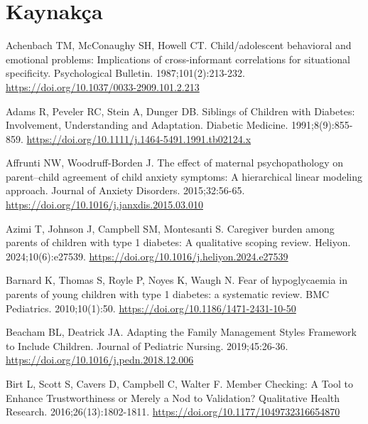\documentclass[
  turkish,
  a4paper,
  DIV=11,
  numbers=noendperiod]{scrreprt}
\newlength{\cslhangindent}
\newenvironment{CSLReferences}[2] %
 {\begin{list}{}{%
  \setlength{\itemindent}{0pt}
  \setlength{\leftmargin}{0pt}
  \setlength{\parsep}{0pt}
  \ifodd #1
   \setlength{\leftmargin}{\cslhangindent}
   \setlength{\itemindent}{-1\cslhangindent}
  \fi
  \setlength{\itemsep}{#2\baselineskip}}}
 {\end{list}}
\begin{document}
\chapter*{Kaynakça}\label{kaynakuxe7a}

\protect{}\label{refs}
\begin{CSLReferences}{1}{0}
Achenbach TM, McConaughy SH, Howell CT. Child/adolescent behavioral and
emotional problems: Implications of cross-informant correlations for
situational specificity. Psychological Bulletin. 1987;101(2):213-232.
\url{https://doi.org/10.1037/0033-2909.101.2.213}

Adams R, Peveler RC, Stein A, Dunger DB. Siblings of Children with
Diabetes: Involvement, Understanding and Adaptation. Diabetic Medicine.
1991;8(9):855-859.
\url{https://doi.org/10.1111/j.1464-5491.1991.tb02124.x}

Affrunti NW, Woodruff-Borden J. The effect of maternal psychopathology
on parent--child agreement of child anxiety symptoms: A hierarchical
linear modeling approach. Journal of Anxiety Disorders. 2015;32:56-65.
\url{https://doi.org/10.1016/j.janxdis.2015.03.010}

Azimi T, Johnson J, Campbell SM, Montesanti S. Caregiver burden among
parents of children with type 1 diabetes: A qualitative scoping review.
Heliyon. 2024;10(6):e27539.
\url{https://doi.org/10.1016/j.heliyon.2024.e27539}

Barnard K, Thomas S, Royle P, Noyes K, Waugh N. Fear of hypoglycaemia in
parents of young children with type 1 diabetes: a systematic review. BMC
Pediatrics. 2010;10(1):50. \url{https://doi.org/10.1186/1471-2431-10-50}

Beacham BL, Deatrick JA. Adapting the Family Management Styles Framework
to Include Children. Journal of Pediatric Nursing. 2019;45:26-36.
\url{https://doi.org/10.1016/j.pedn.2018.12.006}

Birt L, Scott S, Cavers D, Campbell C, Walter F. Member Checking: A Tool
to Enhance Trustworthiness or Merely a Nod to Validation? Qualitative
Health Research. 2016;26(13):1802-1811.
\url{https://doi.org/10.1177/1049732316654870}


\end{CSLReferences}
\end{document}
